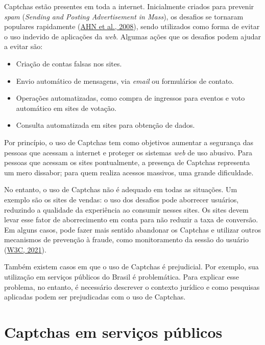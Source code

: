 \documentclass[12pt,twoside,brazilian]{book}
\providecommand{\tightlist}{%
  \setlength{\itemsep}{0pt}\setlength{\parskip}{0pt}}
\begin{document}
Captchas estão presentes em toda a internet. Inicialmente criados para
prevenir \emph{spam} (\emph{Sending and Posting Advertisement in Mass}),
os desafios se tornaram populares rapidamente
(\protect\hyperlink{ref-vonahnReCAPTCHAHumanBasedCharacter2008}{AHN et
al., 2008}), sendo utilizados como forma de evitar o uso indevido de
aplicações da \emph{web}. Algumas ações que os desafios podem ajudar a
evitar são:

\begin{itemize}
\tightlist
\item
  Criação de contas falsas nos sites.
\item
  Envio automático de mensagens, via \emph{email} ou formulários de
  contato.
\item
  Operações automatizadas, como compra de ingressos para eventos e voto
  automático em sites de votação.
\item
  Consulta automatizada em sites para obtenção de dados.
\end{itemize}

Por princípio, o uso de Captchas tem como objetivos aumentar a segurança
das pessoas que acessam a internet e proteger os sistemas \emph{web} de
uso abusivo. Para pessoas que acessam os sites pontualmente, a presença
de Captchas representa um mero dissabor; para quem realiza acessos
massivos, uma grande dificuldade.

No entanto, o uso de Captchas não é adequado em todas as situações. Um
exemplo são os sites de vendas: o uso dos desafios pode aborrecer
usuários, reduzindo a qualidade da experiência ao consumir nesses sites.
Os sites devem levar esse fator de aborrecimento em conta para não
reduzir a taxa de conversão. Em alguns casos, pode fazer mais sentido
abandonar os Captchas e utilizar outros mecanismos de prevenção à
fraude, como monitoramento da sessão do usuário
(\protect\hyperlink{ref-inaccess}{W3C, 2021}).

Também existem casos em que o uso de Captchas é prejudicial. Por
exemplo, sua utilização em serviços públicos do Brasil é problemática.
Para explicar esse problema, no entanto, é necessário descrever o
contexto jurídico e como pesquisas aplicadas podem ser prejudicadas com
o uso de Captchas.

\hypertarget{sec-captchas-publicos}{%
\section{Captchas em serviços públicos}\label{sec-captchas-publicos}}
\end{document}
